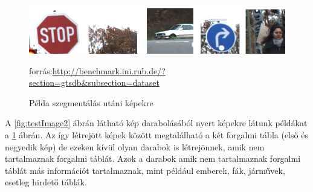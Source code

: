 \begin{figure}[h]
\centering

\includegraphics[scale=1]{images/segments}
\caption{Példa szegmentálás utáni képekre}
\small forrás:\url{http://benchmark.ini.rub.de/?section=gtsdb&subsection=dataset}

\label{fig:segments}
\end{figure}

A \ref{fig:testImage2} ábrán látható kép darabolásából nyert képekre látunk példákat a \ref{fig:segments} ábrán. Az így létrejött képek között megtalálható a két forgalmi tábla (első és negyedik kép) de ezeken kívül olyan darabok is létrejönnek, amik nem tartalmaznak forgalmi táblát. Azok a darabok amik nem tartalmaznak forgalmi táblát más információt tartalmaznak, mint például emberek, fák, járművek, esetleg hirdető táblák. 